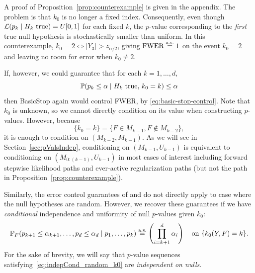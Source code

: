 \documentclass{article}
\begin{document}
A proof of Proposition~\ref{prop:counterexample} is given in the appendix.  The problem is that $k_0$ is no longer a fixed index. Consequently, even though $\L(p_k \mid H_k \text{ true})=U[0,1]$ for each fixed $k$, the $p$-value  corresponding to the {\em first} true null hypothesis is stochastically smaller than uniform. In this counterexample, $k_0=2 \iff |Y_3|>z_{\alpha/2}$, giving $\text{FWER}\eqAS 1$ on the event $k_0=2$ and leaving no room for error when $k_0\neq 2$.

If, however, we could guarantee that for each $k=1,\ldots, d$,
\[
\P(p_k \leq \alpha \mid H_k \text{ true},\, k_0=k) \leq \alpha
\]
then BasicStop again would control FWER, by \eqref{eq:basic-stop-control}. Note that $k_0$ is unknown, so we cannot directly condition on its value when constructing $p$-values. However, because
\[
\{k_0=k\} = \{F\in M_{k-1}, F\notin M_{k-2}\},
\]
it is enough to condition on $(M_{k-2}, M_{k-1})$. As we will see in Section~\ref{sec:pValsIndep}, conditioning on $(M_{k-1}, U_{k-1})$ is equivalent to conditioning on $(M_{0:(k-1)}, U_{k-1})$ in most cases of interest including forward stepwise likelihood paths and ever-active regularization paths (but not the path in Proposition~\ref{prop:counterexample}).

Similarly, the error control guarantees of \citet{gsell2013sequential} and \citet{li2015accumulation} do not directly apply to case where the null hypotheses are random. However, we recover these guarantees if we have {\em conditional} independence and uniformity of null $p$-values given $k_0$:
\begin{equation}\label{eq:indepCond_random_k0}
  \P_F(p_{k+1} \leq \alpha_{k+1}, \ldots, p_d \leq \alpha_d
  \mid p_1, \ldots, p_k) \eqAS \left(\prod_{i=k+1}^d \alpha_i\right) \quad \text{on } \{k_0(Y, F) = k\}.
\end{equation}
For the sake of brevity, we will say that $p$-value sequences satisfying~\eqref{eq:indepCond_random_k0} are {\em independent on nulls}.
\end{document}
